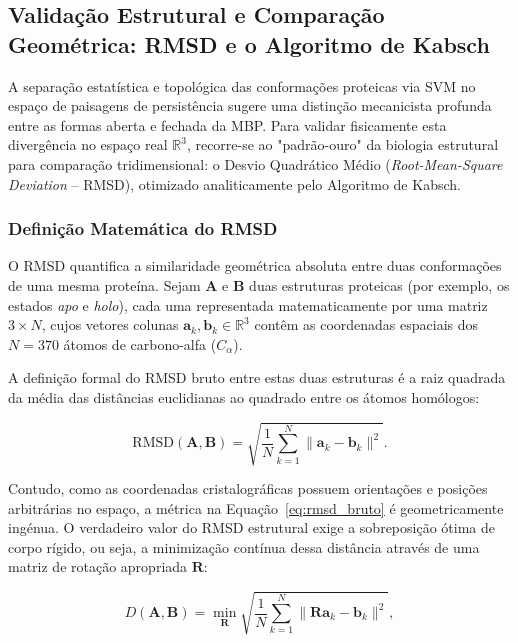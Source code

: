 \documentclass[12pt, a4paper]{article}
\begin{document}
\subsection{Validação Estrutural e Comparação Geométrica: RMSD e o Algoritmo de Kabsch}
\label{sec:rmsd}

A separação estatística e topológica das conformações proteicas via SVM no espaço de paisagens de persistência sugere uma distinção mecanicista profunda entre as formas aberta e fechada da MBP. Para validar fisicamente esta divergência no espaço real $\mathbb{R}^3$, recorre-se ao "padrão-ouro" da biologia estrutural para comparação tridimensional: o Desvio Quadrático Médio (\textit{Root-Mean-Square Deviation} -- RMSD), otimizado analiticamente pelo Algoritmo de Kabsch.

\subsubsection{Definição Matemática do RMSD}

O RMSD quantifica a similaridade geométrica absoluta entre duas conformações de uma mesma proteína. Sejam $\mathbf{A}$ e $\mathbf{B}$ duas estruturas proteicas (por exemplo, os estados \textit{apo} e \textit{holo}), cada uma representada matematicamente por uma matriz $3 \times N$, cujos vetores colunas $\mathbf{a}_k, \mathbf{b}_k \in \mathbb{R}^3$ contêm as coordenadas espaciais dos $N = 370$ átomos de carbono-alfa ($C_\alpha$).

A definição formal do RMSD bruto entre estas duas estruturas é a raiz quadrada da média das distâncias euclidianas ao quadrado entre os átomos homólogos:

\begin{equation}\label{eq:rmsd_bruto}
\mathrm{RMSD}(\mathbf{A}, \mathbf{B}) = \sqrt{ \frac{1}{N} \sum_{k=1}^N \|\mathbf{a}_k - \mathbf{b}_k\|^2 }.
\end{equation}

Contudo, como as coordenadas cristalográficas possuem orientações e posições arbitrárias no espaço, a métrica na Equação~\ref{eq:rmsd_bruto} é geometricamente ingénua. O verdadeiro valor do RMSD estrutural exige a sobreposição ótima de corpo rígido, ou seja, a minimização contínua dessa distância através de uma matriz de rotação apropriada $\mathbf{R}$:

\begin{equation}\label{eq:rmsd_otimo}
D(\mathbf{A}, \mathbf{B}) = \min_{\mathbf{R}} \sqrt{ \frac{1}{N} \sum_{k=1}^N \|\mathbf{R}\mathbf{a}_k - \mathbf{b}_k\|^2 },
\end{equation}
\end{document}
